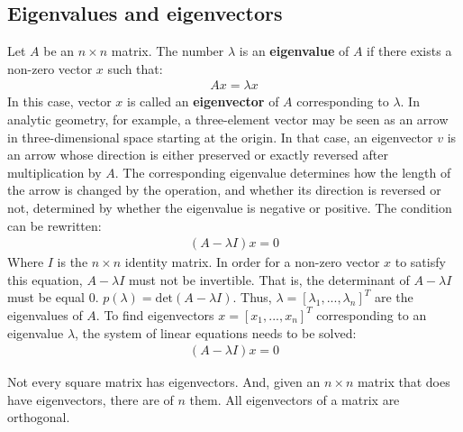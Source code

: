 \documentclass{report}
\begin{document}
\subsection{Eigenvalues and eigenvectors}
Let $A$ be an $n\times n$ matrix. The number $\lambda$ is an {\bf eigenvalue} of $A$ if there exists a non-zero vector $x$ such that:
\begin{align*}
Ax = \lambda x
\end{align*}
In this case, vector $x$ is called an {\bf eigenvector} of $A$ corresponding to $\lambda$. In analytic geometry, for example, a three-element vector may be seen as an arrow in three-dimensional space starting at the origin. In that case, an eigenvector $v$ is an arrow whose direction is either preserved or exactly reversed after multiplication by $A$. The corresponding eigenvalue determines how the length of the arrow is changed by the operation, and whether its direction is reversed or not, determined by whether the eigenvalue is negative or positive. The condition can be rewritten:
\begin{align*}
(A -\lambda I)x = 0
\end{align*}
Where $I$ is the $n\times n$ identity matrix. In order for a non-zero vector $x$ to satisfy this equation, $A -\lambda I$ must not be invertible. That is, the determinant of $A -\lambda I$ must be equal $0$. $p(\lambda)=\mbox{det}(A -\lambda I)$. Thus, $\lambda = [\lambda_1, ..., \lambda_n]^T$ are the eigenvalues of $A$. To find eigenvectors $x = [x_1,...,x_n]^T$ corresponding to an eigenvalue $\lambda$, the system of linear equations needs to be solved:
\begin{align*}
(A -\lambda I)x = 0
\end{align*}

Not every square matrix has eigenvectors. And, given an $n\times n$ matrix that does have eigenvectors, there are of $n$ them.
All eigenvectors of a matrix are orthogonal.
\end{document}

